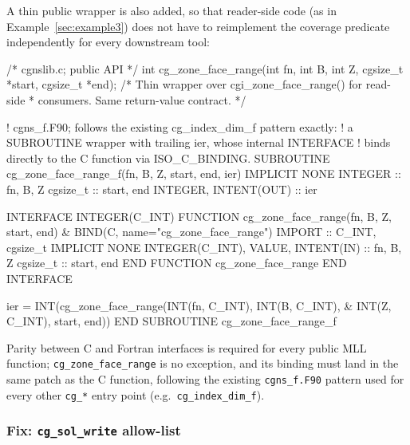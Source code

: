 \documentclass[11pt,letterpaper]{article}
\makeatletter
\let\cgns@orig@lstlisting\lstlisting
\let\cgns@endorig@lstlisting\endlstlisting
\renewenvironment{lstlisting}
  {\par\needspace{5\baselineskip}\nolinenumbers\cgns@orig@lstlisting}
  {\cgns@endorig@lstlisting\par\linenumbers}
\makeatother
\begin{document}
A thin public wrapper is also added, so that reader-side code (as in
Example~\ref{sec:example3}) does not have to reimplement the coverage
predicate independently for every downstream tool:

\begin{lstlisting}[language=C]
/* cgnslib.c; public API */
int cg_zone_face_range(int fn, int B, int Z,
                       cgsize_t *start, cgsize_t *end);
    /* Thin wrapper over cgi_zone_face_range() for read-side
     * consumers. Same return-value contract. */
\end{lstlisting}

\begin{lstlisting}[language=Fortran]
! cgns_f.F90; follows the existing cg_index_dim_f pattern exactly:
! a SUBROUTINE wrapper with trailing ier, whose internal INTERFACE
! binds directly to the C function via ISO_C_BINDING.
SUBROUTINE cg_zone_face_range_f(fn, B, Z, start, end, ier)
  IMPLICIT NONE
  INTEGER :: fn, B, Z
  cgsize_t :: start, end
  INTEGER, INTENT(OUT) :: ier

  INTERFACE
    INTEGER(C_INT) FUNCTION cg_zone_face_range(fn, B, Z, start, end) &
        BIND(C, name="cg_zone_face_range")
      IMPORT :: C_INT, cgsize_t
      IMPLICIT NONE
      INTEGER(C_INT), VALUE, INTENT(IN) :: fn, B, Z
      cgsize_t :: start, end
    END FUNCTION cg_zone_face_range
  END INTERFACE

  ier = INT(cg_zone_face_range(INT(fn, C_INT), INT(B, C_INT), &
                                INT(Z, C_INT), start, end))
END SUBROUTINE cg_zone_face_range_f
\end{lstlisting}

Parity between C and Fortran interfaces is required for every public MLL
function; \texttt{cg\_zone\_face\_range} is no exception, and its binding
must land in the same patch as the C function, following the existing
\texttt{cgns\_f.F90} pattern used for every other \texttt{cg\_*} entry
point (e.g.\ \texttt{cg\_index\_dim\_f}).

\subsubsection{Fix: \texttt{cg\_sol\_write} allow-list}
\label{sec:mll_sol_write_fix}
\end{document}
